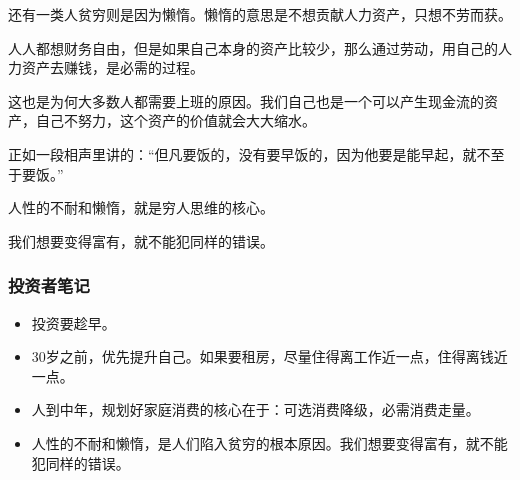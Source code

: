 还有一类人贫穷则是因为懒惰。懒惰的意思是不想贡献人力资产，只想不劳而获。

人人都想财务自由，但是如果自己本身的资产比较少，那么通过劳动，用自己的人力资产去赚钱，是必需的过程。

这也是为何大多数人都需要上班的原因。我们自己也是一个可以产生现金流的资产，自己不努力，这个资产的价值就会大大缩水。

正如一段相声里讲的：“但凡要饭的，没有要早饭的，因为他要是能早起，就不至于要饭。”

人性的不耐和懒惰，就是穷人思维的核心。

我们想要变得富有，就不能犯同样的错误。

\subsubsection{投资者笔记}

\begin{itemize}
\item {\kaishu 投资要趁早。}
\item {\kaishu 30岁之前，优先提升自己。如果要租房，尽量住得离工作近一点，住得离钱近一点。}
\item {\kaishu 人到中年，规划好家庭消费的核心在于：可选消费降级，必需消费走量。}
\item {\kaishu 人性的不耐和懒惰，是人们陷入贫穷的根本原因。我们想要变得富有，就不能犯同样的错误。}
\end{itemize}

